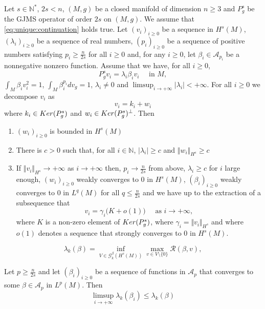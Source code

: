 \documentclass[10pt,a4paper]{amsart}
\def\ker{{\mathop{\rm Ker}}}
\begin{document}
\begin{lemme} \label{lem:mainlemma} Let $s \in \mathbb{N}^*$, $2s <n$, $(M,g)$ be a closed manifold of dimension $n \ge 3$ and $P_g^s$ be the GJMS operator of order $2s$ on $(M,g)$. We assume that \eqref{eq:unique:continuation} holds true. Let $(v_i)_{i \ge0}$ be a sequence in $H^s(M)$, $(\lambda_i)_{i\ge0}$ be a sequence of real numbers, $(p_i)_{i \ge0}$ be a sequence of positive numbers satisfying $p_i \ge \frac{n}{2s}$ for all $i \ge 0$ and, for any $i \ge0$, let $\beta_i \in \mathcal{A}_{p_i}$ be a nonnegative nonzero function. Assume that we have, for all $i \ge 0$, 
\begin{equation}  \label{eq:vecteursvi}
 P_g^s v_i = \lambda_i \beta_i v_i  \quad \text{ in } M, 
 \end{equation}
 $ \int_M \beta_i v_i^2 = 1$, $\int_{M} \beta_i^{p_i} dv_g = 1$, $\lambda_i\neq 0$ and $\limsup_{i\to +\infty} \vert \lambda_i \vert < +\infty$. For all $i \ge 0$ we decompose $v_i$ as 
 $$ v_i = k_i + w_i $$
where $k_i \in \ker(P_g^s)$ and $w_i \in \ker(P_g^s)^{\perp}$. Then 
\begin{enumerate}
\item $ ( w_i )_{i \ge0} $ is bounded in $H^s(M)$
\item There is $c>0$ such that, for all $i\in \mathbb{N}$, $\left\vert \lambda_i \right\vert \geq c$ and $\Vert w_i \Vert_{H^s} \ge c$
\item If $\Vert v_i \Vert_{H^s} \to +\infty$ as $i\to +\infty$ then, $p_i \to \frac{n}{2s}$ from above, $\lambda_i \geq c$ for $i$ large enough, $(w_i)_{i \ge0}$ weakly converges to $0$ in $H^s(M)$, $(\beta_i)_{i \ge0}$ weakly converges to $0$ in $L^q(M)$ for all $q \leq \frac{n}{2s}$ and we have up to the extraction of a subsequence that
$$ v_i = \gamma_i \big(K + o(1) \big) \quad \text{ as } i \to + \infty,$$
where $K$ is a non-zero element of $\ker(P_g^s)$, where $\gamma_i = \Vert v_i \Vert_{H^s}$ and where $o(1)$ denotes a sequence that strongly converges to $0$ in $H^s(M)$.
\end{enumerate}
\end{lemme}

\begin{equation} \label{eq:def:lambdak}
 \lambda_k(\beta)= \inf_{V \in \mathcal{G}_k^\beta(H^s(M))} \max_{v\in V\setminus \{0\}}  \mathcal{R}(\beta,v),
 \end{equation}

\begin{prop} \label{prop:uppersemicontinuity}
Let $p \ge \frac{n}{2s}$ and let  $(\beta_i)_{i\ge0}$ be a sequence of functions in $\mathcal{A}_p$ that converges to some $\beta \in \mathcal{A}_p$ in $L^p(M)$. Then
$$ \limsup_{i\to +\infty} \lambda_k(\beta_i) \leq \lambda_k(\beta) $$
\end{prop}
\end{document}
